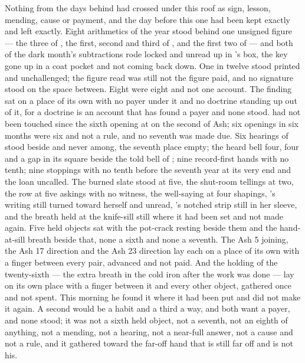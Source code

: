 Nothing from the days behind had crossed under this roof as sign, lesson, mending, cause or payment, and the day before this one had been kept exactly and left exactly. Eight arithmetics of the year stood behind one unsigned figure --- the three of , the first, second and third of , and the first two of  --- and both of the dark month's subtractions rode locked and unread up  in 's box, the key gone up in a coat pocket and not coming back down. One in twelve stood printed and unchallenged; the figure read was still not the figure paid, and no signature stood on the space between. Eight were eight and not one account. The finding sat on a place of its own with no payer under it and no doctrine standing up out of it, for a doctrine is an account that has found a payer and none stood.  had not been touched since the sixth opening at  on the second of Ash; six openings in six months were six and not a rule, and no seventh was made due. Six hearings of  stood beside and never among, the seventh place empty; the heard bell four, four and a gap in its square beside the told bell of ; nine record-first hands with no tenth; nine stoppings with no tenth before the seventh year at its very end and the loan uncalled. The burned slate stood at five, the shut-room tellings at two, the row at five askings with no witness, the well-saying at four shapings, 's writing still turned toward herself and unread, 's notched strip still in her sleeve, and the breath held at the knife-sill still where it had been set and not made again. Five held objects sat with the pot-crack resting beside them and the hand-at-sill breath beside that, none a sixth and none a seventh. The Ash 5 joining, the Ash 17 direction and the Ash 23 direction lay each on a place of its own with a finger between every pair, advanced and not paid. And the holding of the twenty-sixth --- the extra breath in the cold iron after the work was done --- lay on its own place with a finger between it and every other object, gathered once and not spent. This morning he found it where it had been put and did not make it again. A second would be a habit and a third a way, and both want a payer, and none stood; it was not a sixth held object, not a seventh, not an eighth of anything, not a mending, not a hearing, not a near-full answer, not a cause and not a rule, and it gathered toward the far-off hand that is still far off and is not his.

